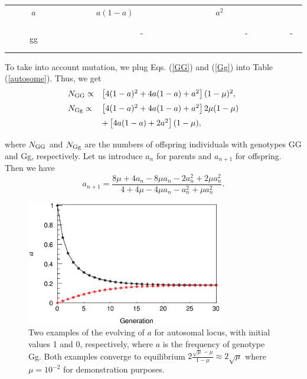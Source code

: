 \documentclass[referee,sn-basic]{sn-jnl}%
\theoremstyle{thmstyleone}%
\theoremstyle{thmstyletwo}%
\theoremstyle{thmstylethree}%
\begin{document}
\begin{table}[htp]
\begin{center}
\begin{tabular}{ c!{\vrule width 1pt}c|c|c }
                        $a$       & $a(1\!-\!a)$      & $a^2$      &       \\
                        \vspace{-3mm} &          &     &     \\
                        \hline
                        \vspace{-2mm}
                        &     &     &          \\
                        \ \ \ \ \ gg\ \ \ \ \       &\ \ \ \ \ \ \ \ \ \ \ \ \ - \ \ \ \ \ \ \ \ \ \ \ \ \    & \ \ \ \ \ \ \ \ \ \ \ \ \ - \ \ \ \ \ \ \ \ \ \ \ \ \     & \ \   - \ \ \         \\
                        \hline
                \end{tabular}
        \end{center}
\end{table}

To take into account mutation, we plug Eqs. (\ref{GG}) and (\ref{Gg}) into Table (\ref{autosome}). Thus, we get
\begin{equation}
 \begin{array}{lll}
\vspace{2mm} N_{\rm GG}\propto&\left[4(1-a)^2+4a(1-a)+a^2\right](1-\mu)^2,\\
\vspace{2mm} N_{\rm Gg}\propto&\left[4(1-a)^2+4a(1-a)+a^2\right]2\mu(1-\mu)\\
\vspace{2mm} &+\left[4a(1-a)+2a^2\right](1-\mu),
  \end{array}
  \vspace{3mm}
\end{equation}
where $N_{\rm GG}$ and $N_{\rm Gg}$ are the numbers of offspring individuals with genotypes GG and Gg, respectively. Let us introduce $a_n$ for parents and $a_{n+1}$ for offspring. Then we have
\begin{equation}
a_{n+1}=\frac{8 \mu + 4a_n - 8 \mu a_n -  2a_n^2 + 2\mu a_n^2}{4 + 4 \mu - 4\mu a_n - a_n^2 + \mu a_n^2 }.
\end{equation}

\begin{figure}
      \includegraphics[width=8.6cm]{Fig2.eps}
      \caption{
Two examples of the evolving of $a$ for autosomal locus, with initial values 1 and 0, respectively, where $a$ is the frequency of genotype Gg. Both examples converge to equilibrium $2\frac{\sqrt{\mu}-\mu}{1-\mu}\approx 2\sqrt{\mu}$ where $\mu=10^{-2}$ for demonstration purposes.
}\label{auto}
\end{figure}
\end{document}
